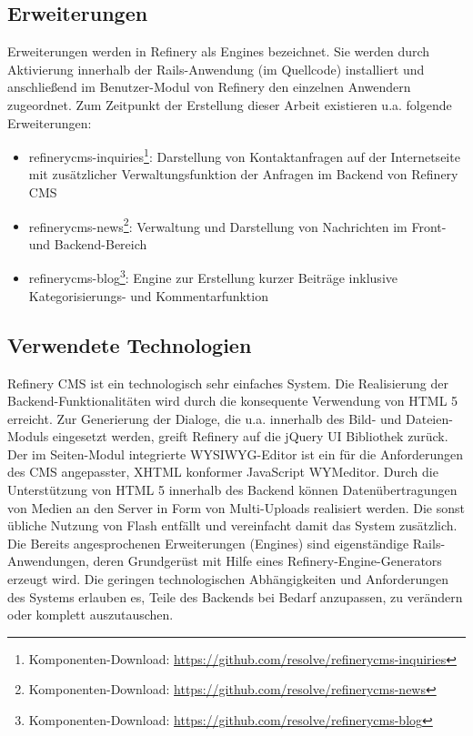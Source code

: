 \subsection{Erweiterungen}
Erweiterungen werden in Refinery als Engines bezeichnet. Sie werden durch Aktivierung innerhalb der Rails-Anwendung (im Quellcode) installiert und anschließend im Benutzer-Modul von Refinery den einzelnen Anwendern zugeordnet. Zum Zeitpunkt der Erstellung dieser Arbeit existieren u.a. folgende Erweiterungen:
\begin{itemize}
\item
refinerycms-inquiries\footnote{Komponenten-Download: \href{https://github.com/resolve/refinerycms-inquiries}{https://github.com/resolve/refinerycms-inquiries}}: Darstellung von Kontaktanfragen auf der Internetseite mit zusätzlicher Verwaltungsfunktion der Anfragen im Backend von Refinery CMS
\item
refinerycms-news\footnote{Komponenten-Download: \href{https://github.com/resolve/refinerycms-news}{https://github.com/resolve/refinerycms-news}}: Verwaltung und Darstellung von Nachrichten im Front- und Backend-Bereich
\item
 refinerycms-blog\footnote{Komponenten-Download: \href{https://github.com/resolve/refinerycms-blog}{https://github.com/resolve/refinerycms-blog}}: Engine zur Erstellung kurzer Beiträge inklusive Kategorisierungs- und Kommentarfunktion
\end{itemize}

\subsection{Verwendete Technologien}
Refinery CMS ist ein technologisch sehr einfaches System. Die Realisierung der Backend-Funktionalitäten wird durch die konsequente Verwendung von HTML 5 erreicht. Zur Generierung der Dialoge, die u.a. innerhalb des Bild- und Dateien-Moduls eingesetzt werden, greift Refinery auf die jQuery UI Bibliothek zurück. Der im Seiten-Modul integrierte WYSIWYG-Editor ist ein für die Anforderungen des CMS angepasster, XHTML konformer JavaScript WYMeditor.
Durch die Unterstützung von HTML 5 innerhalb des Backend können Datenübertragungen von Medien an den Server in Form von Multi-Uploads realisiert werden. Die sonst übliche Nutzung von Flash entfällt und vereinfacht damit das System zusätzlich.
Die Bereits angesprochenen Erweiterungen (Engines) sind eigenständige Rails-Anwendungen, deren Grundgerüst mit Hilfe eines Refinery-Engine-Generators erzeugt wird.
Die geringen technologischen Abhängigkeiten und Anforderungen des Systems erlauben es, Teile des Backends bei Bedarf anzupassen, zu verändern oder komplett auszutauschen.



